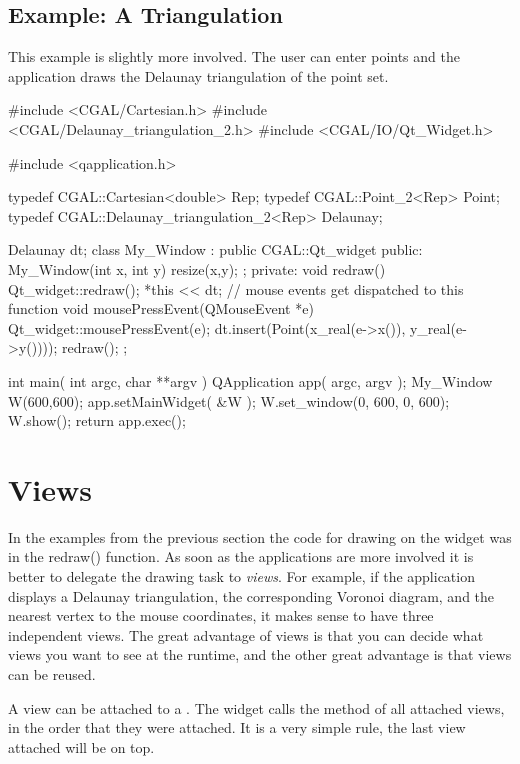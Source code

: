 \subsection{Example: A Triangulation}

This example is slightly more involved. The user can enter points and the application
draws the Delaunay triangulation of the point set. 

\begin{ccExampleCode}
#include <CGAL/Cartesian.h>
#include <CGAL/Delaunay_triangulation_2.h>
#include <CGAL/IO/Qt_Widget.h>

#include <qapplication.h>

typedef CGAL::Cartesian<double>             Rep;
typedef CGAL::Point_2<Rep>                  Point;
typedef CGAL::Delaunay_triangulation_2<Rep> Delaunay;

Delaunay dt;
class My_Window : public CGAL::Qt_widget {
public:
  My_Window(int x, int y){ resize(x,y); };
private:
  void redraw()
  {
    Qt_widget::redraw();
    *this << dt;
  }  
  // mouse events get dispatched to this function
  void mousePressEvent(QMouseEvent *e)
  {
    Qt_widget::mousePressEvent(e);
    dt.insert(Point(x_real(e->x()), y_real(e->y())));
    redraw();
  }
};

int main( int argc, char **argv )
{
    QApplication app( argc, argv );
    My_Window W(600,600);
    app.setMainWidget( &W );
    W.set_window(0, 600, 0, 600);
    W.show();
    return app.exec();
}
\end{ccExampleCode}



\section{Views}
\label{Qt_widget_views}

In the examples from the previous section the code for drawing on the
widget was in the redraw() function. As soon as the applications are more 
involved it is better to delegate the drawing task to {\em views}. 
For example, if the application displays a Delaunay triangulation, the corresponding Voronoi diagram, and the nearest vertex to the mouse coordinates, it 
makes
sense to have three independent views. The great advantage of views is that you
 can decide what views you want to see at the runtime, and the other great 
advantage is that views can be reused.

A view can be attached to a . The widget calls the method  of all attached views, in the order 
that they were attached. It is a very simple rule, the last view attached will 
be on top.

